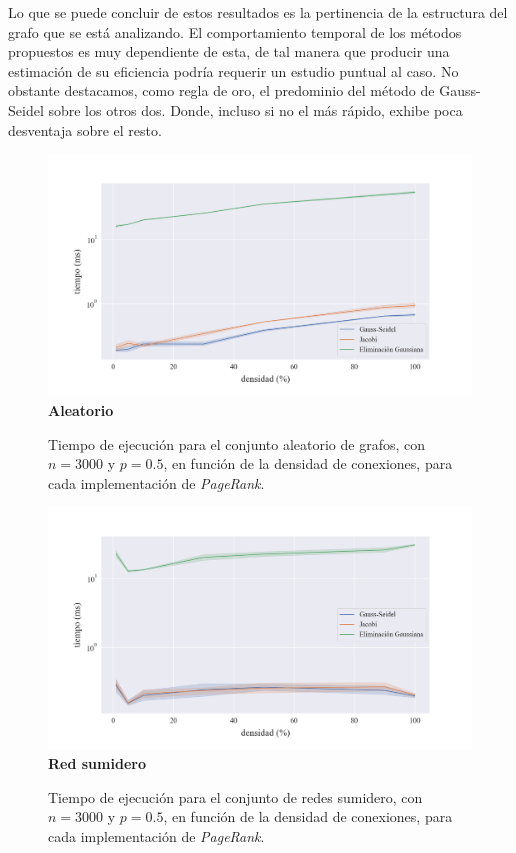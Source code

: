 Lo que se puede concluir de estos resultados es la pertinencia de la estructura del grafo que se está analizando.
El comportamiento temporal de los métodos propuestos es muy dependiente de esta, de tal manera que
producir una estimación de su eficiencia podría requerir un estudio puntual al caso.
No obstante destacamos, como regla de oro, el predominio del método de Gauss-Seidel sobre los otros dos.
Donde, incluso si no el más rápido, exhibe poca desventaja sobre el resto.

\begin{figure}[!htbp]
    \centering
    \includegraphics[width=1\textwidth, trim=0 0 0 30]{files/src/.media/densidad_aleatorio.png}
    \textbf{Aleatorio}\par
    \caption{Tiempo de ejecución para el conjunto aleatorio de grafos, con $n = 3000$ y $p = 0.5$, en función de la densidad de conexiones, para cada implementación de \textit{PageRank}.}
    \label{densidad_aleatorio}
\end{figure}

\begin{figure}[!htbp]
    \centering
    \includegraphics[width=1\textwidth, trim=0 0 0 30]{files/src/.media/densidad_red_sumidero.png}
    \textbf{Red sumidero}\par
    \caption{Tiempo de ejecución para el conjunto de redes sumidero, con $n = 3000$ y $p = 0.5$, en función de la densidad de conexiones, para cada implementación de \textit{PageRank}.}
    \label{densidad_red_sumidero}
\end{figure}

